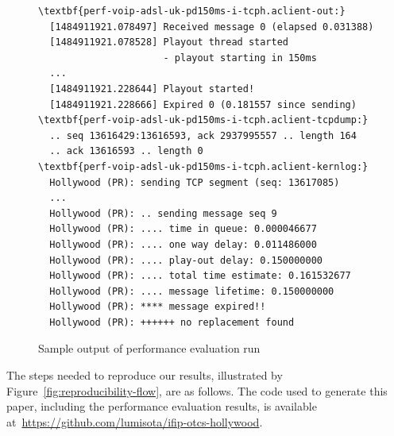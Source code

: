 \begin{figure}[t!]
\scriptsize
\begin{Verbatim}[commandchars=\\\{\}]
\textbf{perf-voip-adsl-uk-pd150ms-i-tcph.aclient-out:}
  [1484911921.078497] Received message 0 (elapsed 0.031388)
  [1484911921.078528] Playout thread started
                      - playout starting in 150ms
  ...
  [1484911921.228644] Playout started!
  [1484911921.228666] Expired 0 (0.181557 since sending)
\textbf{perf-voip-adsl-uk-pd150ms-i-tcph.aclient-tcpdump:}
  .. seq 13616429:13616593, ack 2937995557 .. length 164
  .. ack 13616593 .. length 0
\textbf{perf-voip-adsl-uk-pd150ms-i-tcph.aclient-kernlog:}
  Hollywood (PR): sending TCP segment (seq: 13617085)
  ...
  Hollywood (PR): .. sending message seq 9
  Hollywood (PR): .... time in queue: 0.000046677
  Hollywood (PR): .... one way delay: 0.011486000
  Hollywood (PR): .... play-out delay: 0.150000000
  Hollywood (PR): .... total time estimate: 0.161532677
  Hollywood (PR): .... message lifetime: 0.150000000
  Hollywood (PR): **** message expired!!
  Hollywood (PR): ++++++ no replacement found
\end{Verbatim}
\normalsize
\caption{Sample output of performance evaluation run}
\label{fig:perf-eval-output}
\end{figure}

The steps needed to reproduce our results, illustrated by
Figure~\ref{fig:reproducibility-flow}, are as follows. The code used to generate
this paper, including the performance evaluation results, is available
at~\url{https://github.com/lumisota/ifip-otcs-hollywood}.

